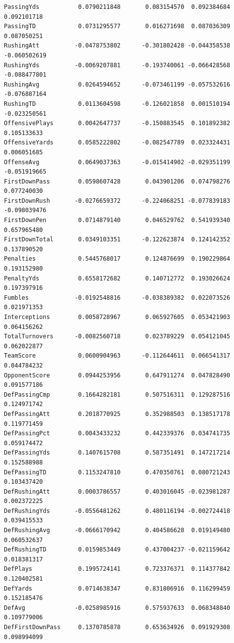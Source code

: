 \documentclass[
  letterpaper,
  DIV=11,
  numbers=noendperiod]{scrreprt}
\begin{document}
\begin{verbatim}
PassingYds           0.0790211848       0.083154570  0.092384684   0.092101718
PassingTD            0.0731295577       0.016271698  0.087036309   0.087050251
RushingAtt          -0.0478753802      -0.301802428 -0.044358538  -0.060502619
RushingYds          -0.0069207881      -0.193740061 -0.066428568  -0.088477801
RushingAvg           0.0264594652      -0.073461199 -0.057532616  -0.076887164
RushingTD            0.0113604598      -0.126021858  0.001510194  -0.023250561
OffensivePlays       0.0042647737      -0.150883545  0.101892382   0.105133633
OffensiveYards       0.0585222802      -0.082547789  0.023324431   0.006051685
OffenseAvg           0.0649037363      -0.015414902 -0.029351199  -0.051919665
FirstDownPass        0.0598607428       0.043901206  0.074798276   0.077240030
FirstDownRush       -0.0276659372      -0.224068251 -0.077839183  -0.098039476
FirstDownPen         0.0714879140       0.046529762  0.541939340   0.657965480
FirstDownTotal       0.0349103351      -0.122623874  0.124142352   0.137890520
Penalties            0.5445768017       0.124876699  0.190229864   0.193152980
PenaltyYds           0.6558172682       0.140712772  0.193026624   0.197397916
Fumbles             -0.0192548816      -0.038389382  0.022073526   0.021971353
Interceptions        0.0058728967       0.065927605  0.053421903   0.064156262
TotalTurnovers      -0.0082560718       0.023789229  0.054121045   0.062022877
TeamScore            0.0600904963      -0.112644611  0.066541317   0.044784232
OpponentScore        0.0944253956       0.647911274  0.047828490   0.091577186
DefPassingCmp        0.1664282181       0.507516311  0.129287516   0.124971742
DefPassingAtt        0.2018770925       0.352988503  0.138517178   0.119771459
DefPassingPct        0.0043433232       0.442339376  0.034741735   0.059174472
DefPassingYds        0.1407615708       0.587351491  0.147217214   0.152588988
DefPassingTD         0.1153247810       0.470350761  0.080721243   0.103437420
DefRushingAtt        0.0003786557       0.403016045 -0.023981287   0.002372225
DefRushingYds       -0.0556481262       0.480116194 -0.002724418   0.039415533
DefRushingAvg       -0.0666170942       0.404586628  0.019149480   0.060532637
DefRushingTD         0.0159853449       0.437004237 -0.021159642   0.018381317
DefPlays             0.1995724141       0.723376371  0.114377842   0.120402581
DefYards             0.0714638347       0.831806916  0.116299459   0.152185476
DefAvg              -0.0258985916       0.575937633  0.068348840   0.109779006
DefFirstDownPass     0.1370785878       0.653634926  0.091929308   0.098994099

\end{verbatim}
\end{document}

